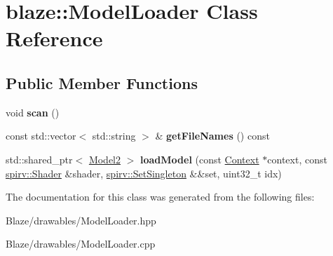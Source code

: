 \hypertarget{classblaze_1_1ModelLoader}{}\section{blaze\+:\+:Model\+Loader Class Reference}
\label{classblaze_1_1ModelLoader}
\subsection*{Public Member Functions}
\begin{DoxyCompactItemize}
\item 
\mbox{\label{classblaze_1_1ModelLoader_ade1ecb4bcd2126ef731c2a0983bef260}} 
void {\bfseries scan} ()
\item 
\mbox{\label{classblaze_1_1ModelLoader_a7f1b91186da558263a94f0843329411d}} 
const std\+::vector$<$ std\+::string $>$ \& {\bfseries get\+File\+Names} () const
\item 
\mbox{\label{classblaze_1_1ModelLoader_a970fb58b570aca28fd93ddca99f5bd2f}} 
std\+::shared\+\_\+ptr$<$ \hyperlink{classblaze_1_1Model2}{Model2} $>$ {\bfseries load\+Model} (const \hyperlink{classblaze_1_1Context}{Context} $\ast$context, const \hyperlink{structblaze_1_1spirv_1_1Shader}{spirv\+::\+Shader} \&shader, \hyperlink{structblaze_1_1spirv_1_1SetSingleton}{spirv\+::\+Set\+Singleton} \&\&set, uint32\+\_\+t idx)
\end{DoxyCompactItemize}


The documentation for this class was generated from the following files\+:\begin{DoxyCompactItemize}
\item 
Blaze/drawables/Model\+Loader.\+hpp\item 
Blaze/drawables/Model\+Loader.\+cpp\end{DoxyCompactItemize}
